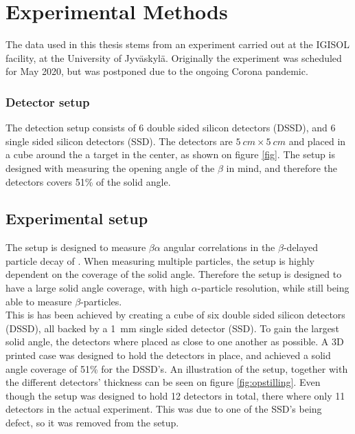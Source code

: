 \chapter{Experimental Methods}
The data used in this thesis stems from an experiment carried out at the IGISOL facility, at the University of Jyväskylä. Originally the experiment was scheduled for May 2020, but was postponed due to the ongoing Corona pandemic. 


\subsection{Detector setup}
The detection setup consists of 6 double sided silicon detectors (DSSD), and 6 single sided silicon detectors (SSD). 
The detectors are $\SI{5}{cm} \times \SI{5}{cm}$ and placed in a cube around the a target in the center, as shown on figure \ref{fig}. The setup is designed with measuring the opening angle of the $\beta$ in mind, and therefore the detectors covers 51\% of the solid angle. \\
 

\section{Experimental setup}
The setup is designed to measure $\beta\alpha$ angular correlations in the $\beta$-delayed particle decay of . When measuring multiple particles, the setup is highly dependent on the coverage of the solid angle. Therefore the setup is designed to have a large solid angle coverage, with high $\alpha$-particle resolution, while still being able to measure $\beta$-particles. \\
This is has been achieved by creating a cube of six double sided silicon detectors (DSSD), all backed by a \SI{1}{mm} single sided detector (SSD). To gain the largest solid angle, the detectors where placed as close to one another as possible. A 3D printed case was designed to hold the detectors in place, and achieved a solid angle coverage of 51\% for the DSSD's. An illustration of the setup, together with the different detectors' thickness can be seen on figure \ref{fig:opstilling}. 
Even though the setup was designed to hold 12 detectors in total, there where only 11 detectors in the actual experiment. This was due to one of the SSD's being defect, so it was removed from the setup. 


